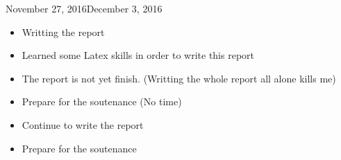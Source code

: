 \begin{fichesuivi}{November 27, 2016}{December 3, 2016}

   \begin{travaileffectue}
        \begin{itemize}
            \item Writting the report
            \item Learned some Latex skills in order to write this report
        \end{itemize}
   \end{travaileffectue}

   \begin{travailnoneffectue}
        \begin{itemize}
            \item The report is not yet finish. (Writting the whole report all alone kills me)
            \item Prepare for the soutenance (No time)
        \end{itemize}
   \end{travailnoneffectue}

 
   \begin{planification}
        \begin{itemize}
            \item Continue to write the report
            \item Prepare for the soutenance
        \end{itemize}
   \end{planification}
\end{fichesuivi}






